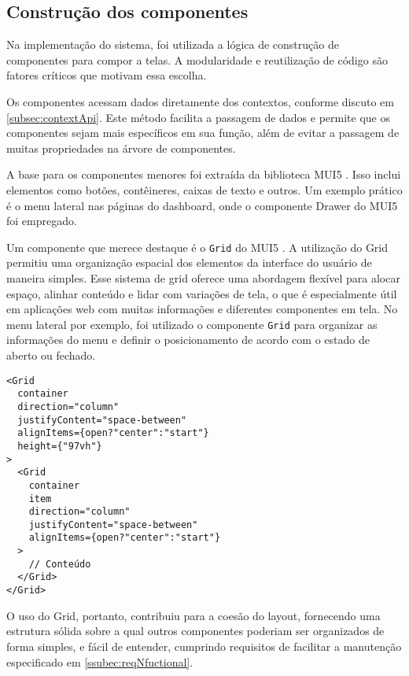 \subsection{Construção dos componentes}\label{subsec:componentization}
Na implementação do sistema, foi utilizada a lógica de construção de componentes \cite{reactFirstComponent} para compor a telas. A modularidade e reutilização de código são fatores críticos que motivam essa escolha. 

Os componentes acessam dados diretamente dos contextos, conforme discuto em \ref{subsec:contextApi}. Este método facilita a passagem de dados e permite que os componentes sejam mais específicos em sua função, além de evitar a passagem de muitas propriedades na árvore de componentes.

A base para os componentes menores foi extraída da biblioteca \gls{MUI5} \cite{muiDocs}. Isso inclui elementos como botões, contêineres, caixas de texto e outros. Um exemplo prático é o menu lateral nas páginas do dashboard, onde o componente Drawer do \gls{MUI5} foi empregado. 

Um componente que merece destaque é o \texttt{Grid} do \gls{MUI5} \cite{muiReactGrid}. A utilização do Grid permitiu uma organização espacial dos elementos da interface do usuário de maneira simples. Esse sistema de grid oferece uma abordagem flexível para alocar espaço, alinhar conteúdo e lidar com variações de tela, o que é especialmente útil em aplicações web com muitas informações e diferentes componentes em tela. No menu lateral por exemplo, foi utilizado o componente \texttt{Grid} para organizar as informações do menu e definir o posicionamento de acordo com o estado de aberto ou fechado.

\begin{verbatim}
<Grid 
  container
  direction="column"
  justifyContent="space-between"
  alignItems={open?"center":"start"}
  height={"97vh"}
>
  <Grid 
    container
    item
    direction="column"
    justifyContent="space-between"
    alignItems={open?"center":"start"}
  >
    // Conteúdo
  </Grid>
</Grid>
\end{verbatim}

O uso do Grid, portanto, contribuiu para a coesão do layout, fornecendo uma estrutura sólida sobre a qual outros componentes poderiam ser organizados de forma simples, e fácil de entender, cumprindo requisitos de facilitar a manutenção especificado em \ref{ssubec:reqNfuctional}.

